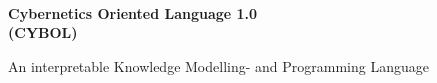 %
%
%
%
%
%

\begin{center}
    \begin{Large}
        \authormacro\\
    \end{Large}
    \vspace*{1cm}
    \begin{huge}
        \textbf{Cybernetics Oriented Language 1.0\\
        (CYBOL)}\\
    \end{huge}
    \vspace{1cm}
    \begin{normalsize}
        An interpretable Knowledge Modelling- and Programming Language\\
    \end{normalsize}
    \vspace{7cm}
    \begin{normalsize}

\end{normalsize}
\end{center}
